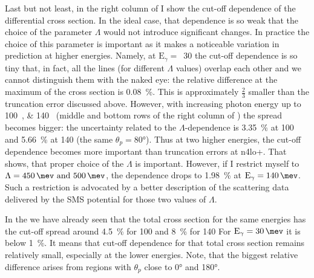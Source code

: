     Last but not least, in the right column of 
    I show the cut-off dependence of the differential cross section.
    In the ideal case, that dependence is so weak that
    the choice of the parameter $\Lambda$ would not introduce significant 
    changes. In practice the choice of this parameter is 
    important as it makes a noticeable variation in prediction at higher energies.
    Namely, at $\text{E}_\gamma=$~\SI{30}{\mev} the cut-off dependence is so tiny
    that, in fact, all the lines (for different $\Lambda$ values)
    overlap each other and we cannot distinguish them with the naked eye:
    the relative difference at the maximum of the cross section is \SI{0.08}{\percent}.
    This is approximately $\frac{2}{3}$ smaller than the truncation error discussed above.
    However, with increasing photon energy up to \SIlist{100; 140}{\mev} 
    (middle and bottom rows of the right column of ) the spread becomes bigger:
    the  uncertainty related to the 
    $\Lambda$-dependence is  \SI{3.35}{\percent} at \SI{100}{\mev}
    and \SI{5.66}{\percent} at \SI{140}{\mev} (the same $\theta_p = \ang{80}$).
    Thus at two higher energies, the cut-off dependence becomes more important
    than truncation errors at \gls{n4lo+}.
    That shows, that proper choice of the $\Lambda$ is important.
    However, if I restrict myself to $\Lambda=\SIlist{450;500}{\mev}$,
    the dependence drops to \SI{1.98}{\percent} at $\text{E}_\gamma=\SI{140}{\mev}$.
    Such a restriction is advocated by a better description of the scattering data
    delivered by the SMS potential for those two values of $\Lambda$.

    In the  we have already seen that the total
    cross section for the same energies has the cut-off spread
    around \SI{4.5}{\percent} for \SI{100}{\mev} and \SI{8}{\percent} for \SI{140}{\mev}
     For $\text{E}_\gamma=\SI{30}{\mev}$ it is below  \SI{1}{\percent}.
     It means that cut-off dependence for that total cross section remains
     relatively small, especially at the lower energies.
     Note, that the biggest relative difference arises from regions 
     with $\theta_p$ close to \ang{0} and \ang{180}.


